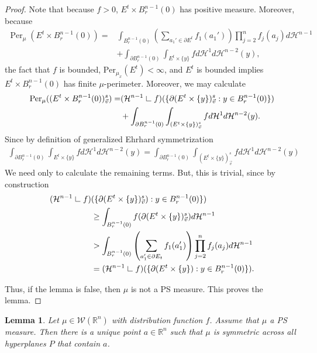 \documentclass[12pt]{amsart}
\numberwithin{equation}{section}
\theoremstyle{plain}
\newtheorem{lemma}[theorem]{Lemma}
\theoremstyle{definition}
\newcommand{\res}{\hbox{ {\vrule height .22cm}{\leaders\hrule\hskip.2cm} }}
\begin{document}
\begin{proof}
Note that because $f>0$, $E^{t} \times B_r^{n-1}(0)$ has positive measure.  Moreover, because
\begin{align*}
\operatorname{Per}_{\mu}(E^{t} \times B_r^{n-1}(0)) = &  \int_{B_r^{n-1}(0)} \left(\sum_{a_1' \in \partial E^t} f_1(a_1') \right) \prod_{j=2}^nf_j(a_j)d\mathcal{H}^{n-1}\\
& + \int_{\partial B_r^{n-1}(0)} \int_{E^{t}\times \{y\}} f d\mathcal{H}^1d\mathcal{H}^{n-2}(y),
\end{align*}
the fact that $f$ is bounded, $\text{Per}_{\mu_x}(E^t)<\infty$, and $E^t$ is bounded implies $E^{t} \times B_r^{n-1}(0)$ has finite $\mu$-perimeter.  Moreover, we may calculate
\begin{align*}
\operatorname{Per}_{\mu}((E^{t} \times B_r^{n-1}(0))^s_{\vec{v}}) = &  (\mathcal{H}^{n-1}\res f)(\{\partial (E^t \times \{y\})^s_{\vec{v}} :y \in B_r^{n-1}(0) \})\\
& + \int_{\partial B_r^{n-1}(0)} \int_{(E^{t} \times \{y\})^s_{\vec{v}}} f d\mathcal{H}^1d\mathcal{H}^{n-2}(y).
\end{align*}
Since by definition of generalized Ehrhard symmetrization
\begin{align*}
\int_{\partial B_r^{n-1}(0)} \int_{E^{t} \times \{y\}} f d\mathcal{H}^1 d\mathcal{H}^{n-2}(y)=
\int_{\partial B_r^{n-1}(0)} \int_{(E^{t} \times \{y\})^s_{\vec{v}}} f d\mathcal{H}^1 d\mathcal{H}^{n-2}(y)
\end{align*}
We need only to calculate the remaining terms.  But, this is trivial, since by construction
\begin{align*} (\mathcal{H}^{n-1}\res f)&(\{\partial (E^t \times \{y\})^{s}_{\vec{v}}): y \in B_r^{n-1}(0) \})\\
& \ge \int_{B_{r}^{n-1}(0)} f(\partial (E^t \times \{y\})^{s}_{\vec{v}})d\mathcal{H}^{n-1}\\
& >  \int_{B_r^{n-1}(0)} \left(\sum_{a_1' \in \partial E_t} f_1(a_1') \right) \prod_{j=2}^nf_j(a_j)d\mathcal{H}^{n-1}\\
& = (\mathcal{H}^{n-1}\res f)(\{\partial (E^t \times \{y\}) :y \in B_r^{n-1}(0) \}).
\end{align*}

Thus, if the lemma is false, then $\mu$ is not a PS measure. This proves the lemma.
\end{proof}


\begin{lemma}\label{l:symmetric in Rn}
Let $\mu \in \mathscr{W}(\mathbb{R}^n)$ with distribution function $f$.  Assume that $\mu$ a PS measure.  Then there is a unique point $a \in \mathbb{R}^n$ such that $\mu$ is symmetric across all hyperplanes $P$ that contain $a$.
\end{lemma}
\end{document}
